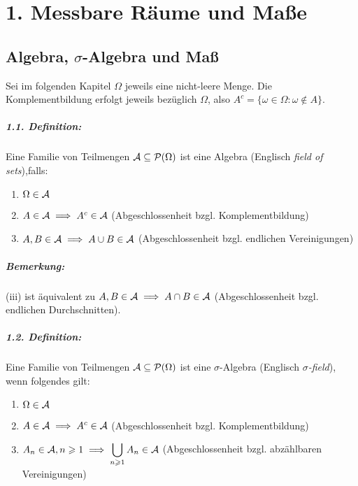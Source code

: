 
\chapter*{1. Messbare R\"aume und Ma\ss{}e}

\section*{Algebra, $\sigma$-Algebra und Ma\ss{}}

Sei im folgenden Kapitel $\Omega$ jeweils eine nicht-leere Menge. Die Komplementbildung erfolgt jeweils bez\"uglich $\Omega$, also $A^c=\{\omega\in\Omega:\omega\notin A\}$.

\paragraph{1.1. Definition:} Eine Familie von Teilmengen $\mathcal{A}\subseteq\mathcal{P}(\Omega)$ ist eine Algebra (Englisch \textit{field of sets}),falls:
\begin{enumerate}[label=(\roman*)]
    \item $\Omega\in\mathcal{A}$ 
    \item $A\in\mathcal{A}\implies A^c\in\mathcal{A}$ (Abgeschlossenheit bzgl. Komplementbildung)
    \item $A,B\in\mathcal{A}\implies A\cup B\in\mathcal{A}$ (Abgeschlossenheit bzgl. endlichen Vereinigungen)
\end{enumerate}

\paragraph{Bemerkung:} (iii) ist \"aquivalent zu $A,B\in\mathcal{A}\implies A\cap B\in\mathcal{A}$ (Abgeschlossenheit bzgl. endlichen Durchschnitten).

\paragraph{1.2. Definition:} Eine Familie von Teilmengen $\mathcal{A}\subseteq\mathcal{P}(\Omega)$ ist eine $\sigma$-Algebra (Englisch \textit{$\sigma$-field}), wenn folgendes gilt:
\begin{enumerate}[label=(\roman*)]
    \item $\Omega\in\mathcal{A}$
    \item $A\in\mathcal{A}\implies A^c\in\mathcal{A}$ (Abgeschlossenheit bzgl. Komplementbildung)
    \item $A_n\in\mathcal{A},n\geqslant1\implies\displaystyle\bigcup_{n\geqslant1}A_n\in\mathcal{A}$ (Abgeschlossenheit bzgl. abz\"ahlbaren Vereinigungen)
\end{enumerate}

